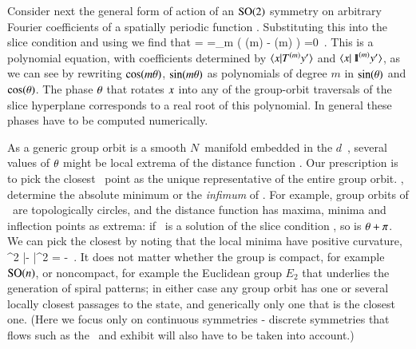 Consider next the general form  of action of an
$\textrm{SO}(2)$ symmetry on arbitrary Fourier coefficients of a spatially
periodic function . Substituting this into the slice
condition  and using  we find that
\bea
{}
=
\continue
=\sum\limits_m
   \left(
     \cos(m\gSpace)
  -  \sin(m\gSpace)
   \right)
   =0
\,.
\label{eq:so2sing}
\eea
This is a polynomial equation, with coefficients determined by
$\braket{\ssp}{\Lg^{(m)} \slicep}$ and $\braket{\ssp}{\id^{(m)}\slicep}$,
as we can see by rewriting $\cos(m{\bf \theta})$, $\sin(m{\bf \theta})$ as
polynomials of degree $m$ in $\sin({\bf \theta})$ and $\cos({\bf \theta})$. The
phase ${\bf \theta}$ that rotates $x$ into any of the group-orbit
traversals of the slice hyperplane corresponds to a real root of this
polynomial. In general these phases have to be computed numerically.

As a generic group orbit is a smooth $N$\dmn\ manifold embedded in the
$d$\dmn\ \statesp, several values of ${\bf \theta}$ might be local extrema of
the distance function .
Our prescription is to pick the closest \reducedsp\ point as the unique
representative of the entire group orbit. \ie, determine the absolute
minimum or the \emph{infimum} of .
For example, group orbits of
\ are topologically circles, and the distance function
 has maxima, minima and inflection points as extrema:
if \gSpace\ is a solution of the slice condition ,
so is ${\bf \theta}+\pi$. We can pick the closest by noting that
the local minima have positive curvature,
\beq
{}
     {\partial \gSpace^2}
        |\sspRed - \slicep|^2
    =
-  \braket{\sspRed}{\Lg^2\slicep}
\,.
It does not matter
whether the group is compact, for example $\textrm{SO}(n)$, or noncompact, for
example the Euclidean group $E_2$ that underlies the generation of spiral
patterns; in either case any group orbit has one or several
locally closest passages to the {\template} state, and generically only
one that is the closest one.
(Here we focus only on continuous symmetries - discrete symmetries that
flows such as the \KS\ and {\pCf} exhibit will also have to be taken into
account.)

